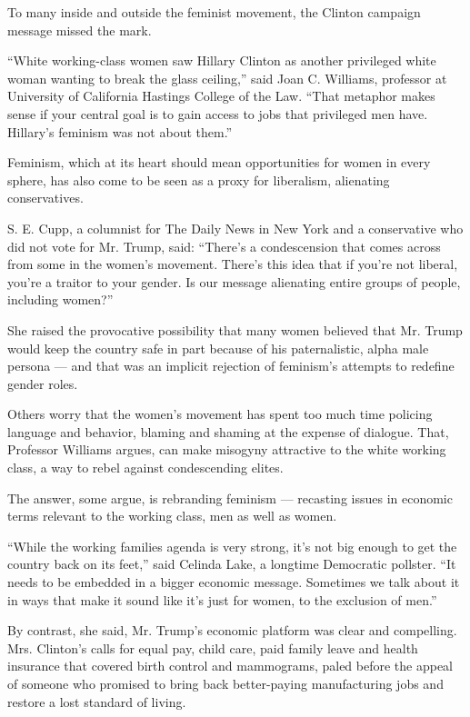 To many inside and outside the feminist movement, the Clinton campaign
message missed the mark.

``White working-class women saw Hillary Clinton as another privileged
white woman wanting to break the glass ceiling,'' said Joan C. Williams,
professor at University of California Hastings College of the Law.
``That metaphor makes sense if your central goal is to gain access to
jobs that privileged men have. Hillary's feminism was not about them.''

Feminism, which at its heart should mean opportunities for women in
every sphere, has also come to be seen as a proxy for liberalism,
alienating conservatives.

S. E. Cupp, a columnist for The Daily News in New York and a
conservative who did not vote for Mr. Trump, said: ``There's a
condescension that comes across from some in the women's movement.
There's this idea that if you're not liberal, you're a traitor to your
gender. Is our message alienating entire groups of people, including
women?''

She raised the provocative possibility that many women believed that Mr.
Trump would keep the country safe in part because of his paternalistic,
alpha male persona --- and that was an implicit rejection of feminism's
attempts to redefine gender roles.

Others worry that the women's movement has spent too much time policing
language and behavior, blaming and shaming at the expense of dialogue.
That, Professor Williams argues, can make misogyny attractive to the
white working class, a way to rebel against condescending elites.

The answer, some argue, is rebranding feminism --- recasting issues in
economic terms relevant to the working class, men as well as women.

``While the working families agenda is very strong, it's not big enough
to get the country back on its feet,'' said Celinda Lake, a longtime
Democratic pollster. ``It needs to be embedded in a bigger economic
message. Sometimes we talk about it in ways that make it sound like it's
just for women, to the exclusion of men.''

By contrast, she said, Mr. Trump's economic platform was clear and
compelling. Mrs. Clinton's calls for equal pay, child care, paid family
leave and health insurance that covered birth control and mammograms,
paled before the appeal of someone who promised to bring back
better-paying manufacturing jobs and restore a lost standard of living.

